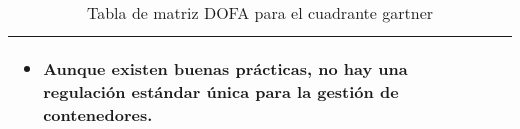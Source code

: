 \begin{table}[H]
\begin{tabularx}{\textwidth}{|X|X|}
\begin{minipage}[t]{\dimexpr\linewidth-8mm}
\begin{itemize}
    \item Aunque existen buenas prácticas, no hay una regulación estándar única para la gestión de contenedores.
\end{itemize}
\vspace{2pt}
\end{minipage}
\hspace{4mm} %
\\
\hline
\end{tabularx}
\caption{Tabla de matriz DOFA para el cuadrante gartner}\label{tab:matriz-dofa}
\end{table}